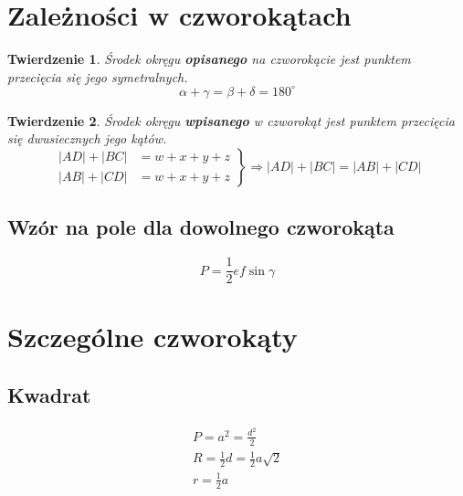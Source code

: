 \documentclass{article}
\numberwithin{equation}{section}
\newtheorem{theorem}{Twierdzenie}[section]
\begin{document}
  \section{Zależności w czworokątach}
    \begin{theorem}
      Środek okręgu \textbf{opisanego} na czworokącie jest punktem przecięcia się jego symetralnych.
      \begin{equation}
        \alpha + \gamma = \beta + \delta = 180^\circ
      \end{equation}
    \end{theorem}
    \begin{theorem}
      Środek okręgu \textbf{wpisanego} w czworokąt jest punktem przecięcia się dwusiecznych jego kątów.
      \begin{equation}
        \left.
          \begin{aligned}
            |AD| + |BC| &= w+x+y+z\\
            |AB| + |CD| &= w+x+y+z
          \end{aligned}
        \right\}
        \Rightarrow |AD| + |BC| = |AB| + |CD|
      \end{equation}
    \end{theorem}
    \subsection{Wzór na pole dla dowolnego czworokąta}
    \begin{equation}
      P = \frac 12ef\sin\gamma
    \end{equation}

  \section{Szczególne czworokąty}
    \subsection{Kwadrat}
      \begin{center}
      \end{center}
      \begin{gather}
        P = a^2 = \frac{d^2}{2}\\
        R = \frac 12d = \frac 12a\sqrt2\\
        r = \frac 12a
      \end{gather}
\end{document}
